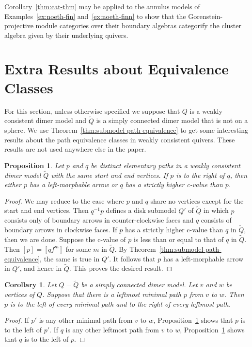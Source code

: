 \documentclass{article}
\newtheorem{prop}[thm]{Proposition}
\newtheorem{cor}[thm]{Corollary}
\theoremstyle{definition}
\begin{document}
Corollary~\ref{thm:cat-thm} may be applied to the annulus models of Examples~\ref{ex:noeth-fin} and~\ref{ex:noeth-finn} to show that the Gorenstein-projective module categories over their boundary algebras categorify the cluster algebra given by their underlying quivers.

\section{Extra Results about Equivalence Classes}\label{sec:thin-quivers}\label{sec:eraec}

For this section, unless otherwise specified we suppose that $Q$ is a weakly consistent dimer model and $\widetilde{Q}$ is a simply connected dimer model that is not on a sphere. We use Theorem~\ref{thm:submodel-path-equivalence} to get some interesting results about the path equivalence classes in weakly consistent quivers. These results are not used anywhere else in the paper. 

\begin{prop}\label{prop:catch-all-right-left-c-value-thing}
    Let $p$ and $q$ be distinct elementary paths in a weakly consistent dimer model $\widetilde Q$ with the same start and end vertices. If $p$ is to the right of $q$, then either $p$ has a left-morphable arrow or $q$ has a strictly higher c-value than $p$.
\end{prop}
\begin{proof}
	We may reduce to the case where $p$ and $q$ share no vertices except for the start and end vertices. Then $q^{-1}p$ defines a disk submodel $Q'$ of $\widetilde Q$ in which $p$ consists only of boundary arrows in counter-clockwise faces and $q$ consists of boundary arrows in clockwise faces. If $p$ has a strictly higher c-value than $q$ in $\widetilde Q$, then we are done. Suppose the c-value of $p$ is less than or equal to that of $q$ in $\widetilde Q$. Then $[p]=[qf^m]$ for some $m$ in $\widetilde Q$. By Theorem~\ref{thm:submodel-path-equivalence}, the same is true in $Q'$. It follows that $p$ has a left-morphable arrow in $Q'$, and hence in $\widetilde Q$. This proves the desired result.
\end{proof}

\begin{cor}\label{cor:lrcool}
	Let $Q=\widetilde Q$ be a simply connected dimer model.
	Let $v$ and $w$ be vertices of $Q$. Suppose that there is a leftmost minimal path $p$ from $v$ to $w$. Then $p$ is to the left of every minimal path and to the right of every leftmost path.
\end{cor}
\begin{proof}
	If $p'$ is any other minimal path from $v$ to $w$, Proposition~\ref{prop:catch-all-right-left-c-value-thing} shows that $p$ is to the left of $p'$. If $q$ is any other leftmost path from $v$ to $w$, Proposition~\ref{prop:catch-all-right-left-c-value-thing} shows that $q$ is to the left of $p$.
\end{proof}
\end{document}
